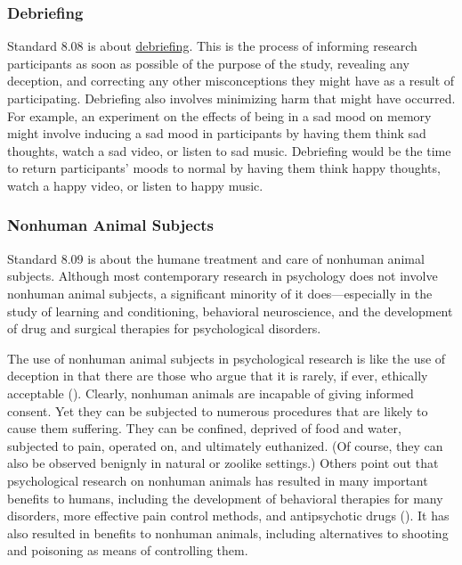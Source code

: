 \documentclass[
]{krantz}
\begin{document}
\subsubsection*{Debriefing}\label{debriefing}


Standard 8.08 is about \hyperref[debriefing]{debriefing}. This is the process of informing research participants as soon as possible of the purpose of the study, revealing any deception, and correcting any other misconceptions they might have as a result of participating. Debriefing also involves minimizing harm that might have occurred. For example, an experiment on the effects of being in a sad mood on memory might involve inducing a sad mood in participants by having them think sad thoughts, watch a sad video, or listen to sad music. Debriefing would be the time to return participants' moods to normal by having them think happy thoughts, watch a happy video, or listen to happy music.

\subsubsection*{Nonhuman Animal Subjects}\label{nonhuman-animal-subjects}


Standard 8.09 is about the humane treatment and care of nonhuman animal subjects. Although most contemporary research in psychology does not involve nonhuman animal subjects, a significant minority of it does---especially in the study of learning and conditioning, behavioral neuroscience, and the development of drug and surgical therapies for psychological disorders.

The use of nonhuman animal subjects in psychological research is like the use of deception in that there are those who argue that it is rarely, if ever, ethically acceptable (). Clearly, nonhuman animals are incapable of giving informed consent. Yet they can be subjected to numerous procedures that are likely to cause them suffering. They can be confined, deprived of food and water, subjected to pain, operated on, and ultimately euthanized. (Of course, they can also be observed benignly in natural or zoolike settings.) Others point out that psychological research on nonhuman animals has resulted in many important benefits to humans, including the development of behavioral therapies for many disorders, more effective pain control methods, and antipsychotic drugs (). It has also resulted in benefits to nonhuman animals, including alternatives to shooting and poisoning as means of controlling them.
\end{document}
